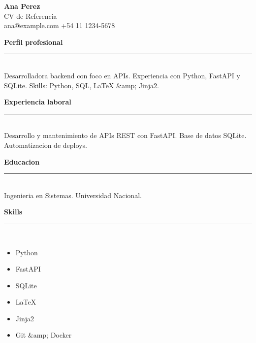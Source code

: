 \documentclass[10pt,a4paper]{article}
\begin{document}
{\Huge \textcolor{primary}{\textbf{Ana Perez}}}\\[0.25em]
{\Large CV de Referencia}\\[0.5em]
{\small ana@example.com \quad +54 11 1234-5678}

\vspace{1.4em}

{\large \textcolor{primary}{\textbf{Perfil profesional}}}\\[-0.25em]
\textcolor{primary}{\rule{\textwidth}{0.6pt}}\\[0.45em]
Desarrolladora backend con foco en APIs. Experiencia con Python, FastAPI y SQLite. Skills: Python, SQL, LaTeX \&amp; Jinja2.

\vspace{0.8em}
{\large \textcolor{primary}{\textbf{Experiencia laboral}}}\\[-0.25em]
\textcolor{primary}{\rule{\textwidth}{0.6pt}}\\[0.45em]
Desarrollo y mantenimiento de APIs REST con FastAPI. Base de datos SQLite. Automatizacion de deploys.

\vspace{0.8em}
{\large \textcolor{primary}{\textbf{Educacion}}}\\[-0.25em]
\textcolor{primary}{\rule{\textwidth}{0.6pt}}\\[0.45em]
Ingenieria en Sistemas. Universidad Nacional.

\vspace{0.8em}
{\large \textcolor{primary}{\textbf{Skills}}}\\[-0.25em]
\textcolor{primary}{\rule{\textwidth}{0.6pt}}\\[0.45em]
\begin{itemize}
  \item Python
  \item FastAPI
  \item SQLite
  \item LaTeX
  \item Jinja2
  \item Git \&amp; Docker
\end{itemize}

\vspace{0.8em}
\end{document}
